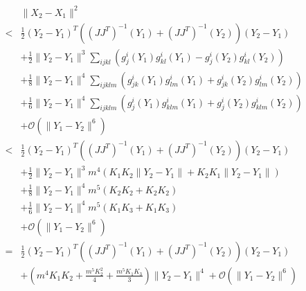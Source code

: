 \documentclass[12pt]{article}
\begin{document}
\begin{eqnarray}
&&\| X_2 - X_1 \|^2 \\
&<& \frac{1}{2} (Y_2 - Y_1 )^T ((J J^T)^{-1} (Y_1) + (J J^T)^{-1}(Y_2)) (Y_2 - Y_1 ) \\
&& + \frac{1}{2} \|Y_2 - Y_1 \|^3 \sum_{ijkl} \left( g_j^i (Y_1) g^i_{kl} (Y_1) - g_j^i (Y_2) g^i_{kl} (Y_2) \right) \\
&& + \frac{1}{8} \|Y_2 - Y_1 \|^4 \sum_{ijklm}  \left( g^i_{jk} (Y_1) g^i_{lm} (Y_1) + g^i_{jk} (Y_2) g^i_{lm} (Y_2)  \right) \\
&& + \frac{1}{6} \|Y_2 - Y_1 \|^4 \sum_{ijklm}  \left( g^i_{j} (Y_1) g^i_{klm} (Y_1) + g^i_{j} (Y_2) g^i_{klm} (Y_2)  \right) \\
&& + \mathcal{O} (\|Y_1 - Y_2 \|^6 ) \\
&<& \frac{1}{2} (Y_2 - Y_1 )^T ((J J^T)^{-1} (Y_1) + (J J^T)^{-1}(Y_2)) (Y_2 - Y_1 ) \\
&& + \frac{1}{2} \|Y_2 - Y_1 \|^3 m^4 \left( K_1 K_2 \|Y_2 - Y_1\| + K_2 K_1 \|Y_2 - Y_1 \| \right) \\
&& + \frac{1}{8} \|Y_2 - Y_1 \|^4 m^5 \left( K_2 K_2 + K_2 K_2  \right) \\
&& + \frac{1}{6} \|Y_2 - Y_1 \|^4 m^5  \left( K_1 K_3 + K_1 K_3  \right) \\
&& + \mathcal{O} (\|Y_1 - Y_2 \|^6 ) \\
&=& \frac{1}{2} (Y_2 - Y_1 )^T ((J J^T)^{-1} (Y_1) + (J J^T)^{-1}(Y_2)) (Y_2 - Y_1 ) \\
&&+ \left( m^4 K_1 K_2 + \frac{m^5 K_2^2}{4} + \frac{m^5 K_1 K_3}{3} \right) \|Y_2 - Y_1 \|^4 
+ \mathcal{O} (\|Y_1 - Y_2 \|^6 )
\end{eqnarray}
\end{document}
